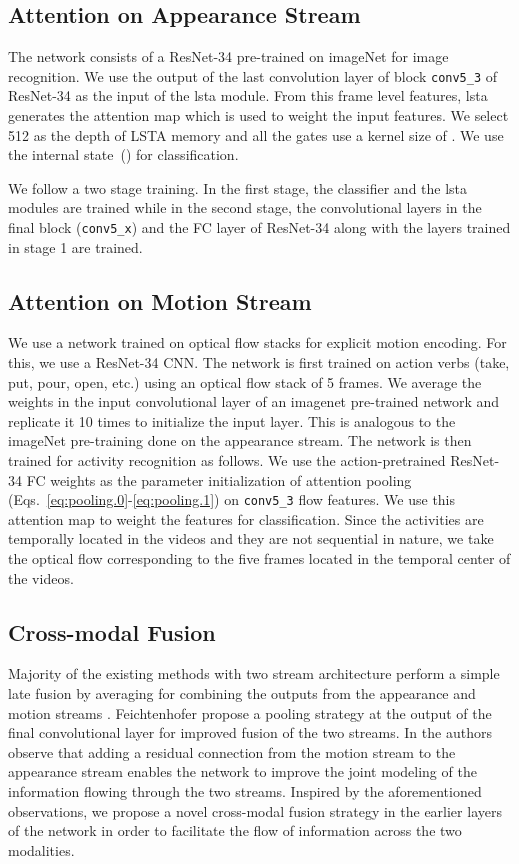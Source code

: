 \documentclass[10pt,twocolumn,letterpaper]{article}
\begin{document}
\begin{matrix*}[r]
\subsection{Attention on Appearance Stream}
\label{sec:app_stream}
	The network consists of a ResNet-34 pre-trained on imageNet for image recognition. We use the output of the last convolution layer of block \verb+conv5_3+ of ResNet-34 as the input of the \ac{lsta} module. From this frame level features, \ac{lsta} generates the attention map which is used to weight the input features. We select 512 as the depth of LSTA memory and all the gates use a kernel size of . We use the internal state~() for classification.
	
	We follow a two stage training. In the first stage, the classifier and the \ac{lsta} modules are trained while in the second stage, the convolutional layers in the final block (\verb+conv5_x+) and the FC layer of ResNet-34 along with the layers trained in stage 1 are trained. 
	
\subsection{Attention on Motion Stream}
\label{sec:motion_stream}
	We use a network trained on optical flow stacks for explicit motion encoding. For this, we use a ResNet-34 CNN. The network is first trained on action verbs (take, put, pour, open, etc.) using an optical flow stack of 5 frames. We average the weights in the input convolutional layer of an imagenet pre-trained network and replicate it 10 times to initialize the input layer. This is analogous to the imageNet pre-training done on the appearance stream. The network is then trained for activity recognition as follows. We use the action-pretrained ResNet-34 FC weights as the parameter initialization of attention pooling (Eqs.~\ref{eq:pooling.0}-\ref{eq:pooling.1}) on \verb+conv5_3+ flow features. We use this attention map to weight the features for classification. Since the activities are temporally located in the videos and they are not sequential in nature, we take the optical flow corresponding to the five frames located in the temporal center of the videos.
\subsection{Cross-modal Fusion}
\label{sec:twostream.cross}
    Majority of the existing methods with two stream architecture perform a simple late fusion by averaging for combining the outputs from the appearance and motion streams \cite{simonyan2014two, TSN2016ECCV}. Feichtenhofer \etal \cite{feichtenhofer2016convolutional} propose a pooling strategy at the output of the final convolutional layer for improved fusion of the two streams. In \cite{feichtenhofer2016spatiotemporal} the authors observe that adding a residual connection from the motion stream to the appearance stream enables the network to improve the joint modeling of the information flowing through the two streams. Inspired by the aforementioned observations, we propose a novel cross-modal fusion strategy in the earlier layers of the network in order to facilitate the flow of information across the two modalities. 



\end{matrix*}
\end{document}
